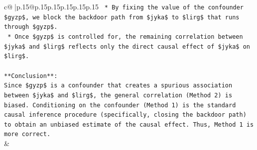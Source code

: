 \documentclass{article}
\begin{document}
{\begin{supertabular}{c@{$\;$}|p{.15\linewidth}@{}p{.15\linewidth}p{.15\linewidth}p{.15\linewidth}p{.15\linewidth}p{.15\linewidth}}
{{{\texttt{    *   By fixing the value of the confounder \$gyzp\$, we block the backdoor path from \$jyka\$ to \$lirg\$ that runs through \$gyzp\$.} \\
\texttt{    *   Once \$gyzp\$ is controlled for, the remaining correlation between \$jyka\$ and \$lirg\$ reflects only the direct causal effect of \$jyka\$ on \$lirg\$.} \\
\\ 
\texttt{**Conclusion**:} \\
\texttt{Since \$gyzp\$ is a confounder that creates a spurious association between \$jyka\$ and \$lirg\$, the general correlation (Method 2) is biased. Conditioning on the confounder (Method 1) is the standard causal inference procedure (specifically, closing the backdoor path) to obtain an unbiased estimate of the causal effect. Thus, Method 1 is more correct.} \\
            }
        }
    }
    & \\ \\


\end{supertabular}}
\end{document}
